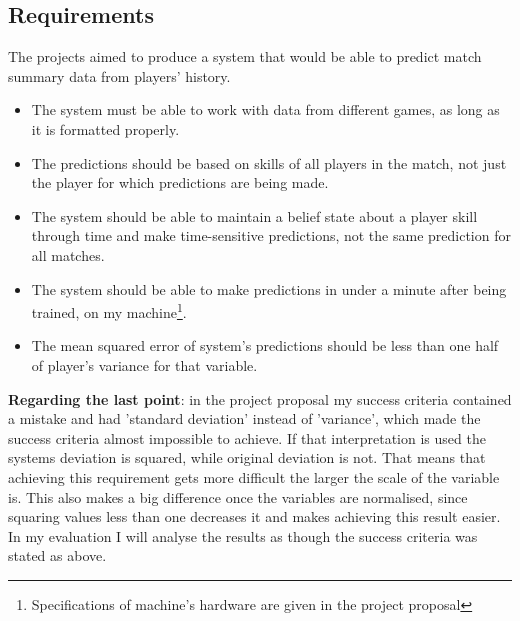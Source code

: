 \documentclass[12pt,a4paper]{book}
\begin{document}
\subsection{Requirements}
The projects aimed to produce a system that would be able to predict match summary data from players' history.
\begin{itemize}
\item The system must be able to work with data from different games, as long as it is formatted properly.
\item The predictions should be based on skills of all players in the match, not just the player for which predictions are being made.
\item The system should be able to maintain a belief state about a player skill through time and make time-sensitive predictions, not the same prediction for all matches.
\item The system should be able to make predictions in under a minute after being trained, on my machine\footnote{Specifications of machine's hardware are given in the project proposal}.
\item The mean squared error of system's predictions should be less than one half of player's variance for that variable.
\end{itemize}
\label{requirements-error}
\textbf{Regarding the last point}: in the project proposal my success criteria contained a mistake and had 'standard deviation' instead of 'variance', which made the success criteria almost impossible to achieve.
If that interpretation is used the systems deviation is squared, while original deviation is not.
That means that achieving this requirement gets more difficult the larger the scale of the variable is.
This also makes a big difference once the variables are normalised, since squaring values less than one decreases it and makes achieving this result easier.
In my evaluation I will analyse the results as though the success criteria was stated as above.
\end{document}
